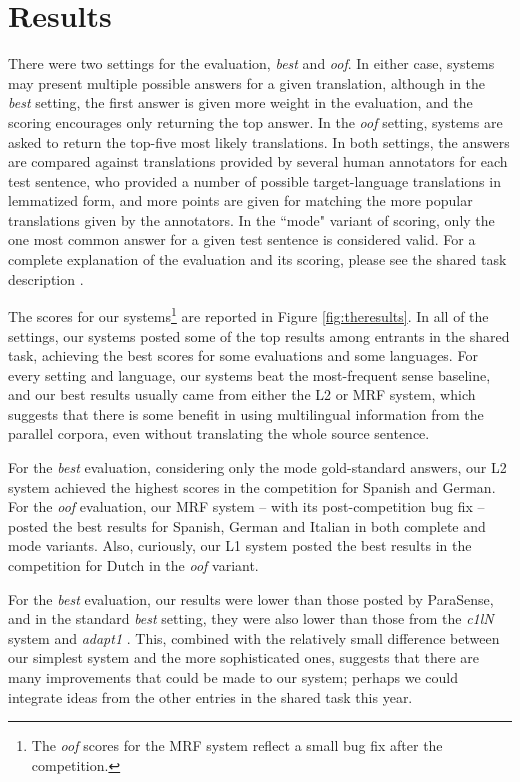 \documentclass[11pt,letterpaper]{article}
\begin{document}
\section{Results}
There were two settings for the evaluation, \emph{best} and \emph{oof}. In
either case, systems may present multiple possible answers for a given
translation, although in the \emph{best} setting, the first answer is given
more weight in the evaluation, and the scoring encourages only returning the
top answer. In the \emph{oof} setting, systems are asked to return the top-five
most likely translations. In both settings, the answers are compared against
translations provided by several human annotators for each test sentence, who
provided a number of possible target-language translations in lemmatized form,
and more points are given for matching the more popular translations given by
the annotators. In the ``mode" variant of scoring, only the one most common
answer for a given test sentence is considered valid. For a complete
explanation of the evaluation and its scoring, please see the shared task
description \cite{task10}. 

The scores for our systems\footnote{The \emph{oof} scores for the MRF system
reflect a small bug fix after the competition.} are reported in Figure
\ref{fig:theresults}. In all of the settings, our systems posted some of the
top results among entrants in the shared task, achieving the best scores for
some evaluations and some languages.  For every setting and language, our
systems beat the most-frequent sense baseline, and our best results usually
came from either the L2 or MRF system, which suggests that there is some
benefit in using multilingual information from the parallel corpora, even
without translating the whole source sentence.

For the \emph{best} evaluation, considering only the mode gold-standard
answers, our L2 system achieved the highest scores in the competition for
Spanish and German. For the \emph{oof} evaluation, our MRF system -- with its
post-competition bug fix -- posted the best results for Spanish, German and
Italian in both complete and mode variants. Also, curiously, our L1 system
posted the best results in the competition for Dutch in the \emph{oof} variant.

For the \emph{best} evaluation, our results were lower than those posted by
ParaSense, and in the standard \emph{best} setting, they were also lower than
those from the \emph{c1lN} system \cite{maarten} and \emph{adapt1}
\cite{marine}. This, combined with the relatively small difference between our
simplest system and the more sophisticated ones, suggests that there are many
improvements that could be made to our system; perhaps we could integrate ideas
from the other entries in the shared task this year.
\end{document}
